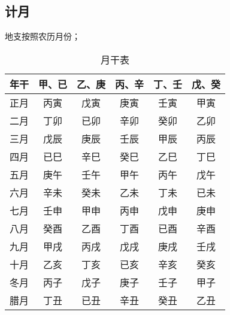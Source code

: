 \subsection{计月}
地支按照农历月份；
\begin{table}[H]
  \centering
  \caption[]{月干表\footnotemark}
  \begin{tabular}{|c|c|c|c|c|c|}
    \hline 年干 & 甲、已 & 乙、庚 & 丙、辛 & 丁、壬 & 戊、癸 \\
    \hline 正月 & 丙寅 & 戊寅 & 庚寅 & 壬寅 & 甲寅 \\
    \hline 二月 & 丁卯 & 已卯 & 辛卯 & 癸卯 & 乙卯 \\
    \hline 三月 & 戊辰 & 庚辰 & 壬辰 & 甲辰 & 丙辰 \\
    \hline 四月 & 已巳 & 辛巳 & 癸巳 & 乙巳 & 丁巳 \\
    \hline 五月 & 庚午 & 壬午 & 甲午 & 丙午 & 戊午 \\
    \hline 六月 & 辛未 & 癸未 & 乙未 & 丁未 & 已未 \\
    \hline 七月 & 壬申 & 甲申 & 丙申 & 戊申 & 庚申 \\
    \hline 八月 & 癸酉 & 乙酉 & 丁酉 & 已酉 & 辛酉 \\
    \hline 九月 & 甲戌 & 丙戌 & 戊戌 & 庚戌 & 壬戌 \\
    \hline 十月 & 乙亥 & 丁亥 & 已亥 & 辛亥 & 癸亥 \\
    \hline 冬月 & 丙子 & 戊子 & 庚子 & 壬子 & 甲子 \\
    \hline 腊月 & 丁丑 & 已丑 & 辛丑 & 癸丑 & 乙丑 \\
    \hline
  \end{tabular}
\end{table}

